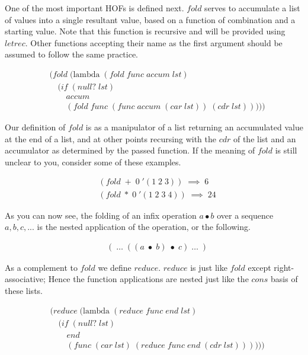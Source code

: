 One of the most important HOFs is defined next. $fold$ serves to accumulate a list 
of values into a single resultant value, based on a function of combination and a 
starting value. Note that this function is recursive and will be provided using 
$letrec$. Other functions accepting their name as the first argument should be 
assumed to follow the same practice.

\begin{figure}[ht]
\caption{}\label{scheme}
\begin{align*}
& (fold \; (\text{lambda} \; (fold \; func \; accum \; lst)
\\& \quad (if \; (null? \; lst)
\\& \qquad accum
\\& \qquad (fold \; func \; (func \; accum \; (car \; lst)) \; (cdr \; lst)))))
\end{align*}
\end{figure}

Our definition of $fold$ is as a manipulator of a list returning an accumulated 
value at the end of a list, and at other points recursing with the $cdr$ of the 
list and an accumulator as determined by the passed function. If the meaning of 
$fold$ is still unclear to you, consider some of these examples.

\begin{figure}[ht]
\caption{}\label{scheme}
\begin{align*}
& (fold \; + \; 0 \; '(1 \; 2 \; 3)) \; \implies \; 6
\\& (fold \; * \; 0 \; '(1 \; 2 \; 3 \; 4)) \; \implies \; 24
\end{align*}
\end{figure}

As you can now see, the folding of an infix operation $a \bullet b$ over a 
sequence $a, b, c, ...$ is the nested application of the operation, or the 
following.

\begin{figure}[ht]
\caption{}\label{scheme}
\begin{align*}
& ( \; \dots \; ((a \; \bullet \; b) \; \bullet \; c) \; \dots \; )
\end{align*}
\end{figure}

As a complement to $fold$ we define $reduce$. $reduce$ is just like $fold$ except 
right-associative; Hence the function applications are nested just like the $cons$ 
basis of these lists.

\begin{figure}[ht]
\caption{}\label{scheme}
\begin{align*}
& (reduce \; (\text{lambda} \; (reduce \; func \; end \; lst)
\\& \quad (if \; (null? \; lst)
\\& \qquad end
\\& \qquad (func \; (car \; lst) \; (reduce \; func \; end \; (cdr \; lst))))))
\end{align*}
\end{figure}

